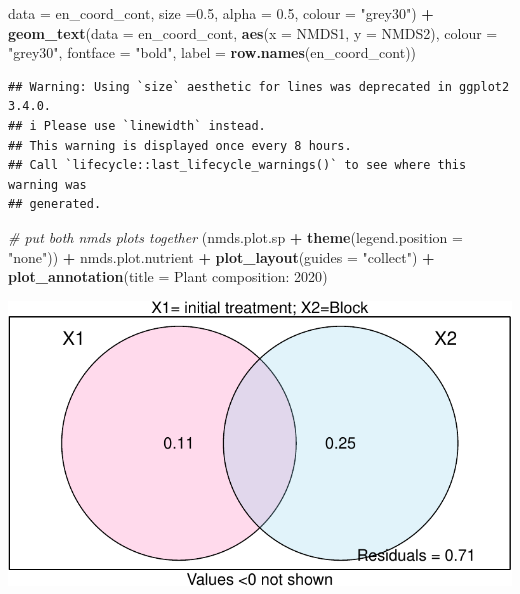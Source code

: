 \documentclass[
]{article}
\newenvironment{Shaded}{\begin{snugshade}}{\end{snugshade}}
\newcommand{\AttributeTok}[1]{\textcolor[rgb]{0.13,0.29,0.53}{#1}}
\newcommand{\CommentTok}[1]{\textcolor[rgb]{0.56,0.35,0.01}{\textit{#1}}}
\newcommand{\FloatTok}[1]{\textcolor[rgb]{0.00,0.00,0.81}{#1}}
\newcommand{\FunctionTok}[1]{\textcolor[rgb]{0.13,0.29,0.53}{\textbf{#1}}}
\newcommand{\NormalTok}[1]{#1}
\newcommand{\SpecialCharTok}[1]{\textcolor[rgb]{0.81,0.36,0.00}{\textbf{#1}}}
\newcommand{\StringTok}[1]{\textcolor[rgb]{0.31,0.60,0.02}{#1}}
\begin{document}
\begin{Shaded}
\begin{Highlighting}[]
       \AttributeTok{data =}\NormalTok{ en\_coord\_cont, }\AttributeTok{size =}\FloatTok{0.5}\NormalTok{, }\AttributeTok{alpha =} \FloatTok{0.5}\NormalTok{, }\AttributeTok{colour =} \StringTok{"grey30"}\NormalTok{) }\SpecialCharTok{+}
     \FunctionTok{geom\_text}\NormalTok{(}\AttributeTok{data =}\NormalTok{ en\_coord\_cont, }\FunctionTok{aes}\NormalTok{(}\AttributeTok{x =}\NormalTok{ NMDS1, }\AttributeTok{y =}\NormalTok{ NMDS2), }\AttributeTok{colour =} \StringTok{"grey30"}\NormalTok{, }
       \AttributeTok{fontface =} \StringTok{"bold"}\NormalTok{, }\AttributeTok{label =} \FunctionTok{row.names}\NormalTok{(en\_coord\_cont))}
\end{Highlighting}
\end{Shaded}

\begin{verbatim}
## Warning: Using `size` aesthetic for lines was deprecated in ggplot2 3.4.0.
## i Please use `linewidth` instead.
## This warning is displayed once every 8 hours.
## Call `lifecycle::last_lifecycle_warnings()` to see where this warning was
## generated.
\end{verbatim}

\begin{Shaded}
\begin{Highlighting}[]
\CommentTok{\# put both nmds plots together}
\NormalTok{(nmds.plot.sp }\SpecialCharTok{+} \FunctionTok{theme}\NormalTok{(}\AttributeTok{legend.position =} \StringTok{"none"}\NormalTok{)) }\SpecialCharTok{+}\NormalTok{ nmds.plot.nutrient }\SpecialCharTok{+} \FunctionTok{plot\_layout}\NormalTok{(}\AttributeTok{guides =} \StringTok{"collect"}\NormalTok{) }\SpecialCharTok{+} \FunctionTok{plot\_annotation}\NormalTok{(}\AttributeTok{title =} \StringTok{\textquotesingle{}Plant composition: 2020\textquotesingle{}}\NormalTok{)}
\end{Highlighting}
\end{Shaded}

\includegraphics{log-project-aubrie-winnie_files/figure-latex/unnamed-chunk-13-2.pdf}
\end{document}
